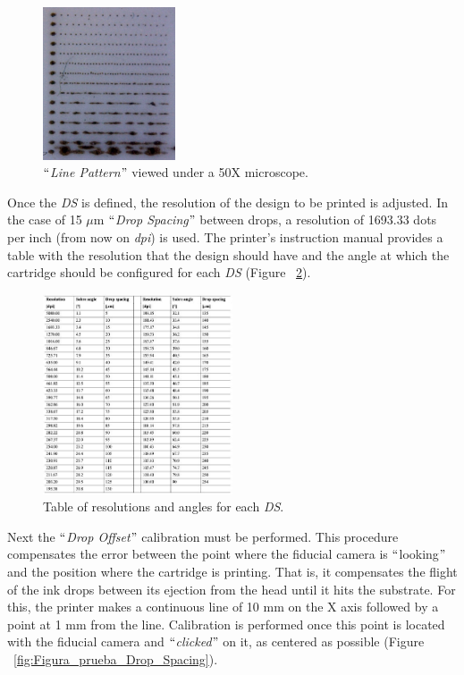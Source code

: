 \begin{figure}[H]
  \centering
    \includegraphics[width=0.35\textwidth]{Figures/Figura_Line_Pattern_Micro50X}
  \caption{$``$\textit{Line Pattern}$"$ viewed under a 50X microscope.}
  \label{fig:Figura_Line_Pattern_Micro50X}
\end{figure}

Once the \emph{DS} is defined, the resolution of the design to be printed is adjusted. In the case of 15 $\mu$m $``$\textit{Drop Spacing}$"$ between drops, a resolution of 1693.33 dots per inch (from now on \emph{dpi}) is used. The printer's instruction manual \cite{DimatixUM} provides a table with the resolution that the design should have and the angle at which the cartridge should be configured for each \emph{DS} (Figure ~\ref{fig:Figura_Tabla_angulos}).

\begin{figure}[H]
  \centering
    \includegraphics[width=0.5\textwidth]{Figures/Figura_Tabla_angulos}
  \caption{Table of resolutions and angles for each \emph{DS}.}
  \label{fig:Figura_Tabla_angulos}
\end{figure}

Next the $``$\textit{Drop Offset}$"$ calibration must be performed. This procedure compensates the error between the point where the fiducial camera is $``$looking$"$ and the position where the cartridge is printing. That is, it compensates the flight of the ink drops between its ejection from the head until it hits the substrate. For this, the printer makes a continuous line of 10 mm on the X axis followed by a point at 1 mm from the line. Calibration is performed once this point is located with the fiducial camera and $``$\textit{clicked}$"$ on it, as centered as possible (Figure ~\ref{fig:Figura_prueba_Drop_Spacing}).

